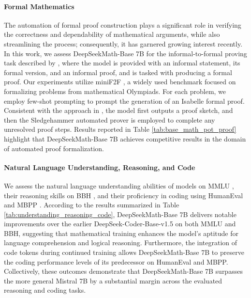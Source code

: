 \begin{itemize}[topsep=0pt]
\paragraph{Formal Mathematics}

The automation of formal proof construction plays a significant role in verifying the correctness and dependability of mathematical arguments, while also streamlining the process; consequently, it has garnered growing interest recently. In this work, we assess DeepSeekMath-Base 7B for the informal-to-formal proving task described by \citep{dsp_proof}, where the model is provided with an informal statement, its formal version, and an informal proof, and is tasked with producing a formal proof. Our experiments utilize miniF2F \citep{minif2f}, a widely used benchmark focused on formalizing problems from mathematical Olympiads. For each problem, we employ few-shot prompting to prompt the generation of an Isabelle formal proof. Consistent with the approach in \cite{dsp_proof}, the model first outputs a proof sketch, and then the Sledgehammer automated prover \citep{sledgehammer} is employed to complete any unresolved proof steps. Results reported in Table \ref{tab:base_math_pot_proof} highlight that DeepSeekMath-Base 7B achieves competitive results in the domain of automated proof formalization.

\paragraph{Natural Language Understanding, Reasoning, and Code}

We assess the natural language understanding abilities of models on MMLU \citep{mmlu}, their reasoning skills on BBH \citep{bbh}, and their proficiency in coding using HumanEval \citep{codex} and MBPP \citep{mbpp}. According to the results summarized in Table \ref{tab:understanding_reasoning_code}, DeepSeekMath-Base 7B delivers notable improvements over the earlier DeepSeek-Coder-Base-v1.5 \citep{deepseek-coder} on both MMLU and BBH, suggesting that mathematical training enhances the model’s aptitude for language comprehension and logical reasoning. Furthermore, the integration of code tokens during continued training allows DeepSeekMath-Base 7B to preserve the coding performance levels of its predecessor on HumanEval and MBPP. Collectively, these outcomes demonstrate that DeepSeekMath-Base 7B surpasses the more general Mistral 7B \citep{mistral} by a substantial margin across the evaluated reasoning and coding tasks.


\end{itemize}
